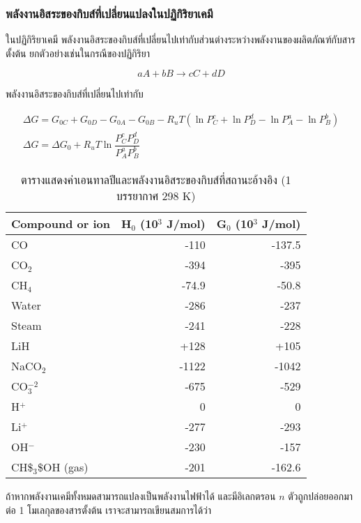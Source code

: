 \documentclass[11pt]{article}
\begin{document}
\subsubsection{พลังงานอิสระของกิบส์ที่เปลี่ยนแปลงในปฏิกิริยาเคมี}
\label{sec:org7a46ff4}

ในปฏิกิริยาเคมี พลังงานอิสระของกิบส์ที่เปลี่ยนไปเท่ากับส่วนต่างระหว่างพลังงานของผลิตภัณฑ์กับสารตั้งต้น ยกตัวอย่างเช่นในกรณีของปฏิกิริยา

\begin{equation*}
  aA + bB \rightarrow cC + dD
\end{equation*}

พลังงานอิสระของกิบส์ที่เปลี่ยนไปเท่ากับ

\begin{gather}
  \Delta G = G_{0C} + G_{0D} - G_{0A} - G_{0B} - R_u T \left( \ln P_C^c + \ln P_D^d - \ln P_A^a - \ln P_B^b \right) \nonumber \\
  \Delta G = \Delta G_0 + R_u T \ln \dfrac{P_C^c P_D^d}{P_A^a P_B^b} 
\end{gather}

\begin{table}[htbp]
\caption{\label{tab:org39b51e7}
ตารางแสดงค่าเอนทาลปีและพลังงานอิสระของกิบส์ที่สถานะอ้างอิง (1 บรรยากาศ 298 K)}
\centering
\begin{tabular}{lrr}
\hline
Compound or ion & H\(_{\text{0}}\) (\texttimes{}10\(^{\text{3}}\) J/mol) & G\(_{\text{0}}\) (\texttimes{}10\(^{\text{3}}\) J/mol)\\
\hline
CO & -110 & -137.5\\
CO\(_2\) & -394 & -395\\
CH\(_4\) & -74.9 & -50.8\\
Water & -286 & -237\\
Steam & -241 & -228\\
LiH & +128 & +105\\
NaCO\(_2\) & -1122 & -1042\\
CO\(_3^{-2}\) & -675 & -529\\
H\(^+\) & 0 & 0\\
Li\(^+\) & -277 & -293\\
OH\(^-\) & -230 & -157\\
CH\$\(_{\text{3}}\)\$OH (gas) & -201 & -162.6\\
\hline
\end{tabular}
\end{table}

ถ้าหากพลังงานเคมีทั้งหมดสามารถแปลงเป็นพลังงานไฟฟ้าได้ และมีอิเลกตรอน \(n\) ตัวถูกปล่อยออกมาต่อ 1 โมเลกุลของสารตั้งต้น เราจะสามารถเขียนสมการได้ว่า
\end{document}
